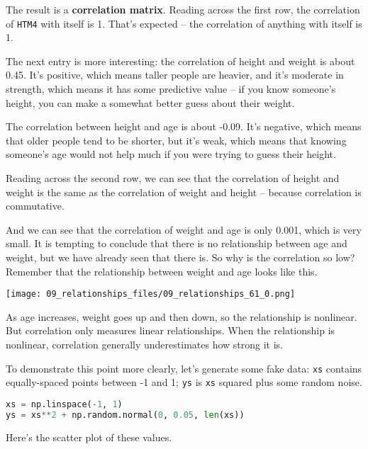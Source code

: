 The result is a \textbf{correlation matrix}. Reading across the first
row, the correlation of \passthrough{\lstinline!HTM4!} with itself is 1.
That's expected -- the correlation of anything with itself is 1.

The next entry is more interesting: the correlation of height and weight
is about 0.45. It's positive, which means taller people are heavier, and
it's moderate in strength, which means it has some predictive value --
if you know someone's height, you can make a somewhat better guess about
their weight.

The correlation between height and age is about -0.09. It's negative,
which means that older people tend to be shorter, but it's weak, which
means that knowing someone's age would not help much if you were trying
to guess their height.

Reading across the second row, we can see that the correlation of height
and weight is the same as the correlation of weight and height --
because correlation is commutative.

And we can see that the correlation of weight and age is only 0.001,
which is very small. It is tempting to conclude that there is no
relationship between age and weight, but we have already seen that there
is. So why is the correlation so low? Remember that the relationship
between weight and age looks like this.



\begin{center}
\texttt{[image: 09\_relationships\_files/09\_relationships\_61\_0.png]}
\end{center}

As age increases, weight goes up and then down, so the relationship is
nonlinear. But correlation only measures linear relationships. When the
relationship is nonlinear, correlation generally underestimates how
strong it is.

To demonstrate this point more clearly, let's generate some fake data:
\passthrough{\lstinline!xs!} contains equally-spaced points between -1
and 1; \passthrough{\lstinline!ys!} is \passthrough{\lstinline!xs!}
squared plus some random noise.

\begin{lstlisting}[language=Python,style=source]
xs = np.linspace(-1, 1)
ys = xs**2 + np.random.normal(0, 0.05, len(xs))
\end{lstlisting}

Here's the scatter plot of these values.


